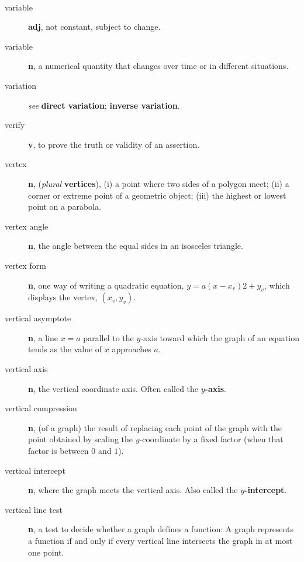 \documentclass[10pt,]{book}
\newcommand{\terminology}[1]{\textbf{#1}}
\theoremstyle{plain}
\theoremstyle{definition}
\theoremstyle{definition}
\theoremstyle{definition}
\numberwithin{equation}{part}
\begin{document}
\paragraph[{}]{}\hypertarget{paragraphs-25}{}
\leavevmode%
\begin{description}
\item[{variable}]\hypertarget{li-837}{}\terminology{adj}, not constant, subject to change.%
\item[{variable}]\hypertarget{li-838}{}\terminology{n}, a numerical quantity that changes over time or in different situations.%
\item[{variation}]\hypertarget{li-839}{}\emph{see} \terminology{direct variation}; \terminology{inverse variation}.%
\item[{verify}]\hypertarget{li-840}{}\terminology{v}, to prove the truth or validity of an assertion.%
\item[{vertex}]\hypertarget{li-841}{}\terminology{n}, (\emph{plural} \terminology{vertices}), (i) a point where two sides of a polygon meet; (ii) a corner or extreme point of a geometric object; (iii) the highest or lowest point on a parabola.%
\item[{vertex angle}]\hypertarget{li-842}{}\terminology{n}, the angle between the equal sides in an isosceles triangle.%
\item[{vertex form}]\hypertarget{li-843}{}\terminology{n}, one way of writing a quadratic equation, \(y = a(x − x_v)2 + y_v\), which displays the vertex, \((x_v, y_v )\).%
\item[{vertical asymptote}]\hypertarget{li-844}{}\terminology{n}, a line \(x = a\) parallel to the \(y\)-axis toward which the graph of an equation tends as the value of \(x\) approaches \(a\).%
\item[{vertical axis}]\hypertarget{li-845}{}\terminology{n}, the vertical coordinate axis. Often called the \terminology{\(y\)-axis}.%
\item[{vertical compression}]\hypertarget{li-846}{}\terminology{n}, (of a graph) the result of replacing each point of the graph with the point obtained by scaling the \(y\)-coordinate by a fixed factor (when that factor is between \(0\) and \(1\)).%
\item[{vertical intercept}]\hypertarget{li-847}{}\terminology{n}, where the graph meets the vertical axis. Also called the \terminology{\(y\)-intercept}.%
\item[{vertical line test}]\hypertarget{li-848}{}\terminology{n}, a test to decide whether a graph defines a function: A graph represents a function if and only if every vertical line intersects the graph in at most one point.%

\end{description}
\end{document}
